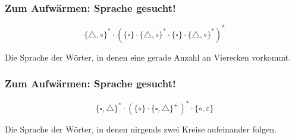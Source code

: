 \begin{frame}
	\frametitle{Zum Aufwärmen: Sprache gesucht!}
	
	$$ \{\triangle, \circ\}^* \cdot ( \{\square\} \cdot \{\triangle, \circ\}^* \cdot \{\square\} \cdot \{\triangle, \circ\}^* )^* $$
	\vspace{15mm}
	\pause
	
	Die Sprache der Wörter, in denen eine gerade Anzahl an Vierecken vorkommt.

\end{frame}

\begin{frame}
	\frametitle{Zum Aufwärmen: Sprache gesucht!}
	
	$$ \{\square, \triangle\}^* \cdot ( \{\circ\} \cdot \{\square, \triangle\}^+ )^* \cdot \{\circ, \varepsilon\} $$
	\vspace{15mm}
	\pause

	Die Sprache der Wörter, in denen nirgends zwei Kreise aufeinander folgen.
\end{frame}